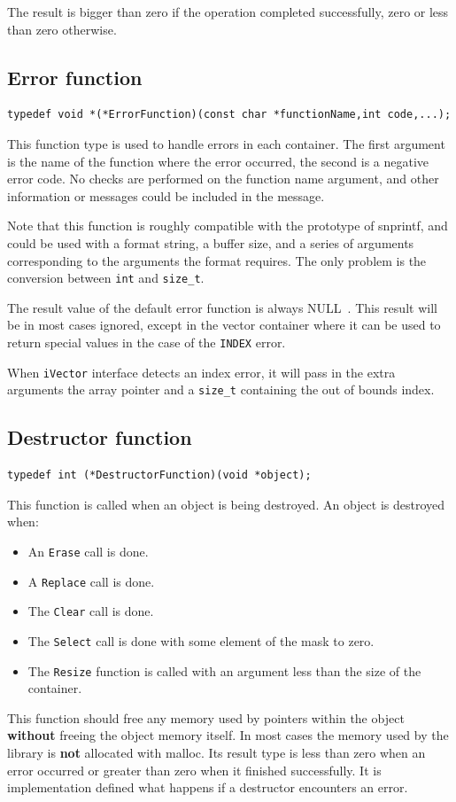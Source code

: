 \documentclass[12pt,a4paper]{memoir} %
\newif\iftth
\newcommand{\Null}{{\iftth \ NULL \else \footnotesize NULL\  \fi}}
\begin{document}
The result is bigger than zero if the operation completed successfully, zero or less than zero otherwise.
\subsection{Error function}
\begin{verbatim}
typedef void *(*ErrorFunction)(const char *functionName,int code,...);
\end{verbatim}
This function type is used to handle errors in each container. The first argument is the name of the function where the error occurred, the second is a 
negative error code. No checks are performed on the function name argument, and other information or messages could be included in the message.

Note that this function is roughly compatible with the prototype of snprintf, and could be used with a format string, a buffer size, and a series of 
arguments corresponding to the arguments the format requires. The only problem is the conversion between \verb,int, and \verb,size_t,.

The result value of the default error function is always \Null. This result will be in most cases ignored, except in the vector container where
it can be used to return special values in the case of the \verb,INDEX, error.

When \verb,iVector, interface detects an index error, it will pass in the extra arguments the array pointer and a \verb,size_t, containing 
the out of bounds index.
\subsection{Destructor function}
\begin{verbatim}
typedef int (*DestructorFunction)(void *object);
\end{verbatim}
This function is called when an object is being destroyed. An object is destroyed when:
\begin{itemize}
\item An \texttt{Erase} call is done.
\item A \texttt{Replace} call is done.
\item The \texttt{Clear} call is done.
\item The \texttt{Select} call is done with some element of the mask to zero.
\item The \texttt{Resize} function is called with an argument less than the size of the container.
\end{itemize}
This function should free any memory used by pointers within the object \textbf{without} freeing the object memory itself. In most cases the memory
used by the library is \textbf{not} allocated with malloc. Its result type is less than zero when an error occurred or greater than zero when
it finished successfully. It is implementation defined what happens if a destructor encounters an error.
\end{document}
